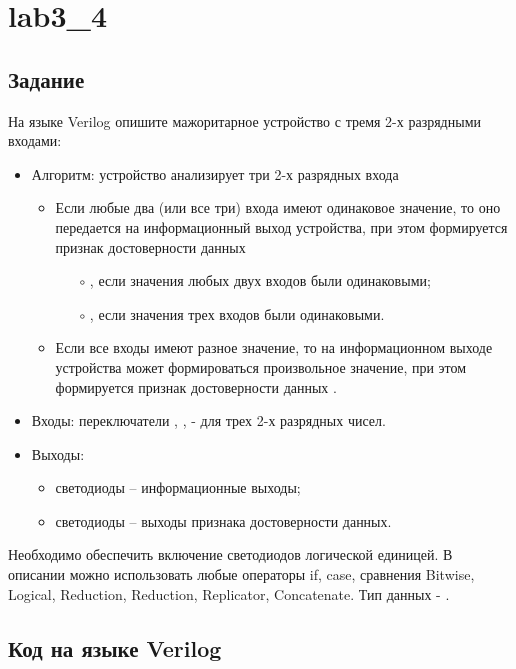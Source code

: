 \section{lab3\_4}

\subsection{Задание}

На языке Verilog опишите мажоритарное устройство с тремя 2-х разрядными входами:
\begin{itemize}
	\item Алгоритм: устройство анализирует три 2-х разрядных входа
		\begin{itemize}
			\item Если любые два (или все три) входа имеют одинаковое значение, то оно передается на информационный выход устройства, при этом формируется признак достоверности данных
				\begin{itemize}
					\item[$\circ$] , если значения любых двух входов были одинаковыми;
					\item[$\circ$] , если значения трех входов были одинаковыми.
				\end{itemize}
			\item Если все входы имеют разное значение, то на информационном выходе устройства может формироваться произвольное значение, при этом формируется признак достоверности данных .
		\end{itemize}
	\item Входы: переключатели , ,  - для трех 2-х разрядных чисел.
	\item Выходы:
		\begin{itemize}
			\item светодиоды  -- информационные выходы;
			\item светодиоды  -- выходы признака достоверности данных.
		\end{itemize}
\end{itemize}

Необходимо обеспечить включение светодиодов логической единицей. В описании можно использовать любые операторы if, case, сравнения Bitwise, Logical, Reduction, Reduction, Replicator, Concatenate. Тип данных - .

\subsection{Код на языке Verilog}

